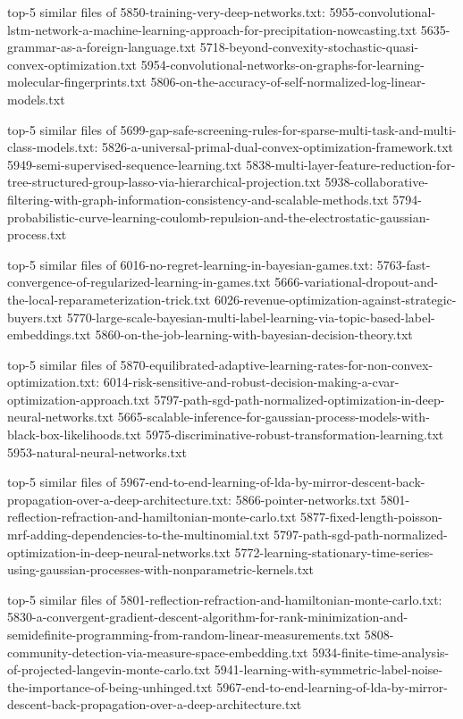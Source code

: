 \documentclass[11pt]{article}
\begin{document}
top-5 similar files of 5850-training-very-deep-networks.txt:
5955-convolutional-lstm-network-a-machine-learning-approach-for-precipitation-nowcasting.txt
5635-grammar-as-a-foreign-language.txt
5718-beyond-convexity-stochastic-quasi-convex-optimization.txt
5954-convolutional-networks-on-graphs-for-learning-molecular-fingerprints.txt
5806-on-the-accuracy-of-self-normalized-log-linear-models.txt

top-5 similar files of
5699-gap-safe-screening-rules-for-sparse-multi-task-and-multi-class-models.txt:
5826-a-universal-primal-dual-convex-optimization-framework.txt
5949-semi-supervised-sequence-learning.txt
5838-multi-layer-feature-reduction-for-tree-structured-group-lasso-via-hierarchical-projection.txt
5938-collaborative-filtering-with-graph-information-consistency-and-scalable-methods.txt
5794-probabilistic-curve-learning-coulomb-repulsion-and-the-electrostatic-gaussian-process.txt

top-5 similar files of 6016-no-regret-learning-in-bayesian-games.txt:
5763-fast-convergence-of-regularized-learning-in-games.txt
5666-variational-dropout-and-the-local-reparameterization-trick.txt
6026-revenue-optimization-against-strategic-buyers.txt
5770-large-scale-bayesian-multi-label-learning-via-topic-based-label-embeddings.txt
5860-on-the-job-learning-with-bayesian-decision-theory.txt

top-5 similar files of
5870-equilibrated-adaptive-learning-rates-for-non-convex-optimization.txt:
6014-risk-sensitive-and-robust-decision-making-a-cvar-optimization-approach.txt
5797-path-sgd-path-normalized-optimization-in-deep-neural-networks.txt
5665-scalable-inference-for-gaussian-process-models-with-black-box-likelihoods.txt
5975-discriminative-robust-transformation-learning.txt
5953-natural-neural-networks.txt

top-5 similar files of
5967-end-to-end-learning-of-lda-by-mirror-descent-back-propagation-over-a-deep-architecture.txt:
5866-pointer-networks.txt
5801-reflection-refraction-and-hamiltonian-monte-carlo.txt
5877-fixed-length-poisson-mrf-adding-dependencies-to-the-multinomial.txt
5797-path-sgd-path-normalized-optimization-in-deep-neural-networks.txt
5772-learning-stationary-time-series-using-gaussian-processes-with-nonparametric-kernels.txt

top-5 similar files of
5801-reflection-refraction-and-hamiltonian-monte-carlo.txt:
5830-a-convergent-gradient-descent-algorithm-for-rank-minimization-and-semidefinite-programming-from-random-linear-measurements.txt
5808-community-detection-via-measure-space-embedding.txt
5934-finite-time-analysis-of-projected-langevin-monte-carlo.txt
5941-learning-with-symmetric-label-noise-the-importance-of-being-unhinged.txt
5967-end-to-end-learning-of-lda-by-mirror-descent-back-propagation-over-a-deep-architecture.txt
\end{document}
